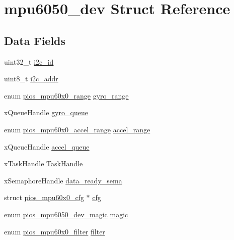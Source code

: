 \hypertarget{structmpu6050__dev}{\section{mpu6050\-\_\-dev \-Struct \-Reference}
\label{structmpu6050__dev}
}
\subsection*{\-Data \-Fields}
\begin{DoxyCompactItemize}
\item 
uint32\-\_\-t \hyperlink{structmpu6050__dev_ac0c61d2a2005659c182ca98984b49dd1}{i2c\-\_\-id}
\item 
uint8\-\_\-t \hyperlink{structmpu6050__dev_a62f37e4827ac7856727a18e7cc6a252d}{i2c\-\_\-addr}
\item 
enum \hyperlink{group___p_i_o_s___m_p_u60_x0_ga56700b0154a14cf67c9f8f44a86ad9c0}{pios\-\_\-mpu60x0\-\_\-range} \hyperlink{structmpu6050__dev_aaf65682756b6135dbeb042934660076a}{gyro\-\_\-range}
\item 
x\-Queue\-Handle \hyperlink{structmpu6050__dev_a91859d6141bf6c0d8dc50d144339baab}{gyro\-\_\-queue}
\item 
enum \hyperlink{group___p_i_o_s___m_p_u60_x0_ga8f297bddae3eb43bbf7b54abc6494992}{pios\-\_\-mpu60x0\-\_\-accel\-\_\-range} \hyperlink{structmpu6050__dev_a4733a0f3b1d592d6858902c3f12cf3b2}{accel\-\_\-range}
\item 
x\-Queue\-Handle \hyperlink{structmpu6050__dev_a59bba40f73e989c812d988c7c1e8a8bc}{accel\-\_\-queue}
\item 
x\-Task\-Handle \hyperlink{structmpu6050__dev_ae7f409a90546c5e2c100212a0bd63d94}{\-Task\-Handle}
\item 
x\-Semaphore\-Handle \hyperlink{structmpu6050__dev_ad4d0a233a1d6f73d37c88f646dd36e3f}{data\-\_\-ready\-\_\-sema}
\item 
struct \hyperlink{structpios__mpu60x0__cfg}{pios\-\_\-mpu60x0\-\_\-cfg} $\ast$ \hyperlink{structmpu6050__dev_ac1b0d1da5fdfa6488dd23aa964573496}{cfg}
\item 
enum \hyperlink{group___p_i_o_s___m_p_u6050_ga22a9ad4120542ed164b6afe9b094b6f3}{pios\-\_\-mpu6050\-\_\-dev\-\_\-magic} \hyperlink{structmpu6050__dev_acc91a02bd2c3ea3808aa09d4358d56ea}{magic}
\item 
enum \hyperlink{group___p_i_o_s___m_p_u60_x0_gacce1988bc994f5ade6ac748c2bf0b924}{pios\-\_\-mpu60x0\-\_\-filter} \hyperlink{structmpu6050__dev_ac959727d047bc26d53673d376f76f8bc}{filter}
\end{DoxyCompactItemize}


